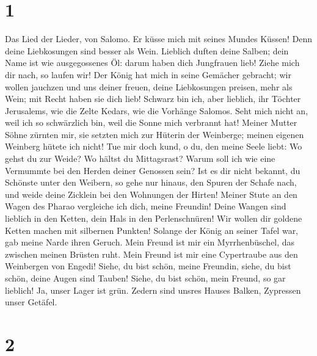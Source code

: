 \hypertarget{section}{%
\section{1}\label{section}}

 Das Lied der Lieder, von Salomo.  Er küsse
mich mit seines Mundes Küssen! Denn deine Liebkosungen sind besser als
Wein.  Lieblich duften deine Salben; dein Name ist wie
ausgegossenes Öl: darum haben dich Jungfrauen lieb!  Ziehe
mich dir nach, so laufen wir! Der König hat mich in seine Gemächer
gebracht; wir wollen jauchzen und uns deiner freuen, deine Liebkosungen
preisen, mehr als Wein; mit Recht haben sie dich lieb! 
Schwarz bin ich, aber lieblich, ihr Töchter Jerusalems, wie die Zelte
Kedars, wie die Vorhänge Salomos.  Seht mich nicht an,
weil ich so schwärzlich bin, weil die Sonne mich verbrannt hat! Meiner
Mutter Söhne zürnten mir, sie setzten mich zur Hüterin der Weinberge;
meinen eigenen Weinberg hütete ich nicht!  Tue mir doch
kund, o du, den meine Seele liebt: Wo gehst du zur Weide? Wo hältst du
Mittagsrast? Warum soll ich wie eine Vermummte bei den Herden deiner
Genossen sein?  Ist es dir nicht bekannt, du Schönste
unter den Weibern, so gehe nur hinaus, den Spuren der Schafe nach, und
weide deine Zicklein bei den Wohnungen der Hirten!  Meiner
Stute an den Wagen des Pharao vergleiche ich dich, meine Freundin!
 Deine Wangen sind lieblich in den Ketten, dein Hals in
den Perlenschnüren!  Wir wollen dir goldene Ketten machen
mit silbernen Punkten!  Solange der König an seiner Tafel
war, gab meine Narde ihren Geruch.  Mein Freund ist mir
ein Myrrhenbüschel, das zwischen meinen Brüsten ruht. 
Mein Freund ist mir eine Cypertraube aus den Weinbergen von Engedi!
 Siehe, du bist schön, meine Freundin, siehe, du bist
schön, deine Augen sind Tauben!  Siehe, du bist schön,
mein Freund, so gar lieblich!  Ja, unser Lager ist grün.
Zedern sind unsres Hauses Balken, Zypressen unser Getäfel.

\hypertarget{section-1}{%
\section{2}\label{section-1}}


